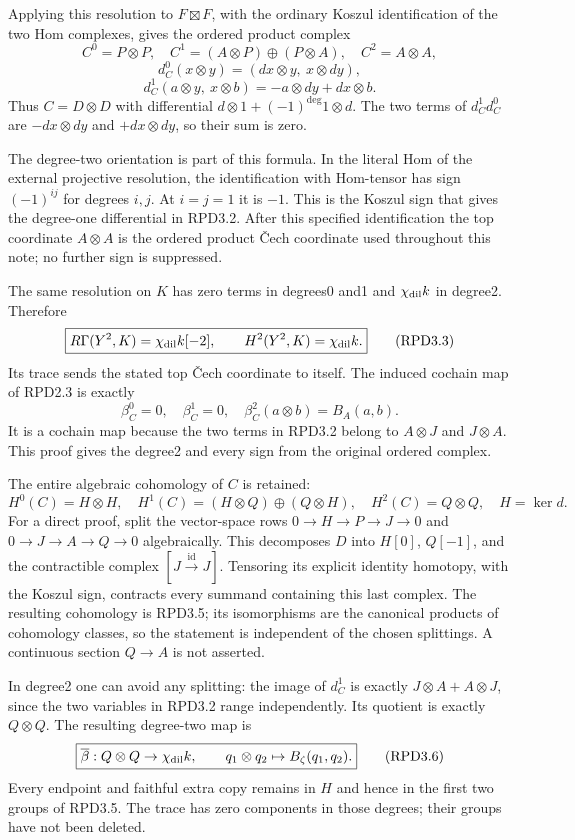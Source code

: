 Applying this resolution to \(F\boxtimes F\), with the ordinary Koszul
identification of the two Hom complexes, gives the ordered product
complex \[
C^0=P\otimes P,\quad
C^1=(A\otimes P)\oplus(P\otimes A),\quad
C^2=A\otimes A,
\tag{RPD3.1}
\] \[
d_C^0(x\otimes y)=(dx\otimes y,\ x\otimes dy),
\] \[
d_C^1(a\otimes y,\ x\otimes b)
=-a\otimes dy+dx\otimes b.
\tag{RPD3.2}
\] Thus \(C=D\otimes D\) with differential
\(d\otimes1+(-1)^{\deg}1\otimes d\). The two terms of \(d_C^1d_C^0\) are
\(-dx\otimes dy\) and \(+dx\otimes dy\), so their sum is zero.

The degree-two orientation is part of this formula. In the literal Hom
of the external projective resolution, the identification with
Hom-tensor has sign \((-1)^{ij}\) for degrees \(i,j\). At \(i=j=1\) it
is \(-1\). This is the Koszul sign that gives the degree-one
differential in RPD3.2. After this specified identification the top
coordinate \(A\otimes A\) is the ordered product Čech coordinate used
throughout this note; no further sign is suppressed.

The same resolution on \(K\) has zero terms in degrees0 and1 and
\(\chi_{\rm dil}k\) in degree2. Therefore \[
\boxed{R\Gamma(Y^2,K)=\chi_{\rm dil}k[-2],\qquad
H^2(Y^2,K)=\chi_{\rm dil}k.}
\tag{RPD3.3}
\] Its trace sends the stated top Čech coordinate to itself. The induced
cochain map of RPD2.3 is exactly \[
\beta_C^0=0,\quad\beta_C^1=0,\quad
\beta_C^2(a\otimes b)=B_A(a,b).
\tag{RPD3.4}
\] It is a cochain map because the two terms in RPD3.2 belong to
\(A\otimes J\) and \(J\otimes A\). This proof gives the degree2 and
every sign from the original ordered complex.

The entire algebraic cohomology of \(C\) is retained: \[
H^0(C)=H\otimes H,\quad
H^1(C)=(H\otimes Q)\oplus(Q\otimes H),\quad
H^2(C)=Q\otimes Q,\quad H=\ker d.
\tag{RPD3.5}
\] For a direct proof, split the vector-space rows
\(0\to H\to P\to J\to0\) and \(0\to J\to A\to Q\to0\) algebraically.
This decomposes \(D\) into \(H[0]\), \(Q[-1]\), and the contractible
complex \([J\xrightarrow{\mathrm{id}}J]\). Tensoring its explicit
identity homotopy, with the Koszul sign, contracts every summand
containing this last complex. The resulting cohomology is RPD3.5; its
isomorphisms are the canonical products of cohomology classes, so the
statement is independent of the chosen splittings. A continuous section
\(Q\to A\) is not asserted.

In degree2 one can avoid any splitting: the image of \(d_C^1\) is
exactly \(J\otimes A+A\otimes J\), since the two variables in RPD3.2
range independently. Its quotient is exactly \(Q\otimes Q\). The
resulting degree-two map is \[
\boxed{\overline\beta:Q\otimes Q\to\chi_{\rm dil}k,\qquad
q_1\otimes q_2\mapsto B_\zeta(q_1,q_2).}
\tag{RPD3.6}
\] Every endpoint and faithful extra copy remains in \(H\) and hence in
the first two groups of RPD3.5. The trace has zero components in those
degrees; their groups have not been deleted.

